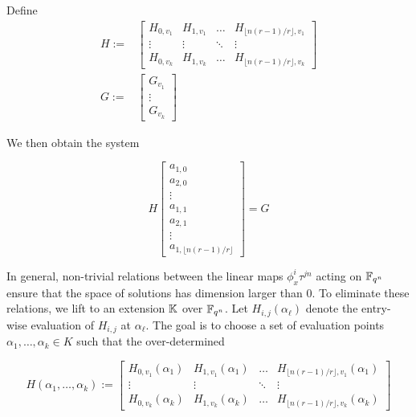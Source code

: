 Define
\begin{align*}
H:= & \begin{bmatrix}
H_{0,v_1} & H_{1, v_1} & \ldots & H_{\lfloor n (r- 1)/r \rfloor, v_1} \\ \vdots & \vdots & \ddots & \vdots \\ H_{0,v_k} & H_{1, v_k} & \ldots & H_{\lfloor n (r-1)/r \rfloor, v_k}
\end{bmatrix}\\
G:= & \begin{bmatrix}
G_{v_1} \\ \vdots \\ G_{v_k}
\end{bmatrix}
\end{align*}

We then obtain the system

\begin{equation*}
H
\begin{bmatrix}
a_{1,0} \\ a_{2,0} \\ \vdots \\ a_{1,1} \\ a_{2,1} \\ \vdots \\ a_{1, \lfloor n (r-1)/r \rfloor}
\end{bmatrix} = G
\end{equation*}

In general, non-trivial relations between the linear maps $\phi_x^i\tau^{jn}$ acting on $\mathbb{F}_{q^n}$ ensure that the space of solutions has dimension larger than 0. To eliminate these relations, we lift to an extension $\mathbb{K}$ over $\mathbb{F}_{q^n}$. Let $H_{i, j}(\alpha_{\ell})$ denote the entry-wise evaluation of $H_{i, j}$ at $\alpha_{\ell}$. The goal is to choose a set of evaluation points $\alpha_1, \ldots, \alpha_k \in K$ such that the over-determined

\begin{equation*}
    H(\alpha_1, \ldots, \alpha_k) := \begin{bmatrix}
H_{0,v_1}(\alpha_1) & H_{1, v_1}(\alpha_1) & \ldots & H_{\lfloor n (r-1)/r \rfloor, v_1}(\alpha_1) \\ \vdots & \vdots & \ddots & \vdots \\ H_{0,v_k}(\alpha_k) & H_{1, v_k}(\alpha_k) & \ldots & H_{\lfloor n (r-1)/r\rfloor, v_k}(\alpha_k)
\end{bmatrix}
\end{equation*}

